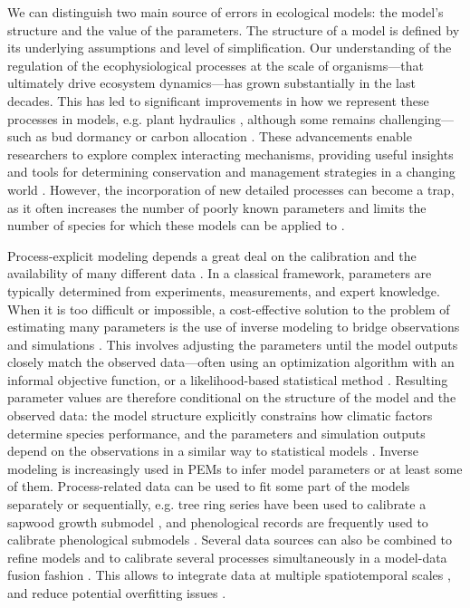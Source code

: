 \documentclass[preprint,12pt,authoryear]{elsarticle}
\begin{document}
We can distinguish two main source of errors in ecological models: the model's structure and the value of the parameters. The structure of a model is defined by its underlying assumptions and level of simplification. Our understanding of the regulation of the ecophysiological processes at the scale of organisms---that ultimately drive  ecosystem dynamics---has grown substantially in the last decades. This has led to significant improvements in how we represent these processes in models, e.g. plant hydraulics \citep{Ruffault2022}, although some remains challenging---such as bud dormancy \citep{Chuine2016} or carbon allocation \citep{Hartmann2020}. 
These advancements enable researchers to explore complex interacting mechanisms, providing useful insights and tools for determining conservation and management strategies in a changing world \citep{Urban2016}. However, the incorporation of new detailed processes can become a trap, as it often increases the number of poorly known parameters and limits the number of species for which these models can be applied to \citep{Franklin2020}. %

Process-explicit modeling depends a great deal on the calibration and the availability of \textcolor{customred}{many different data} \citep{Cabral2017}. In a classical framework, parameters are typically determined from experiments, measurements, and expert knowledge. When it is too difficult or impossible, a cost-effective solution to the problem of estimating many parameters is the use of inverse modeling to bridge observations and simulations \citep{Evans2016}. This involves adjusting the parameters until the model outputs closely match the observed data---often using an optimization algorithm with an informal objective function, or a likelihood-based statistical method \citep{Malchow2024}. Resulting parameter values are therefore conditional on the structure of the model  and the observed data: the model structure explicitly constrains how climatic factors determine species performance, and the parameters and simulation outputs depend on the observations in a similar way to statistical models \citep{Zhang2024}. Inverse modeling is increasingly used in PEMs to infer model parameters or at least some of them. Process-related data can be used to fit some part of the models separately or sequentially, e.g. tree ring series have been used to calibrate a sapwood growth submodel \citep{DeCaceres2023}, and phenological records are frequently used to calibrate phenological submodels \citep{Chuine2013}. Several data sources can also be combined to refine models \citep{Pagel2011, BenitoGarzon2019} and to calibrate several processes simultaneously in a model-data fusion fashion \citep[e.g.][]{Trotsiuk2020}. This allows to integrate data at multiple spatiotemporal scales \citep{Hartig2012, Niu2014}, and reduce potential overfitting issues \citep{Bacour2023}.
\end{document}
